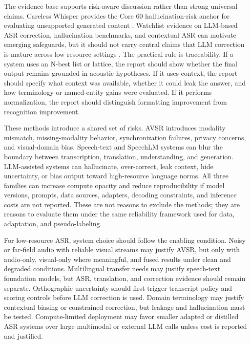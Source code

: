 \documentclass[pdflatex,sn-basic]{sn-jnl}
\theoremstyle{thmstyleone}
\theoremstyle{thmstyletwo}
\theoremstyle{thmstylethree}
\begin{document}
The evidence base supports risk-aware discussion rather than strong universal claims. Careless Whisper provides the Core 60 hallucination-risk anchor for evaluating unsupported generated content \citep{koenecke2024carelesswhisper}. Watchlist evidence on LLM-based ASR correction, hallucination benchmarks, and contextual ASR can motivate emerging safeguards, but it should not carry central claims that LLM correction is mature across low-resource settings \citep{ma2024asrerrorcorrection,koudounas2025shallow,wang2025contextasrbench}. The practical rule is traceability. If a system uses an N-best list or lattice, the report should show whether the final output remains grounded in acoustic hypotheses. If it uses context, the report should specify what context was available, whether it could leak the answer, and how terminology or named-entity gains were evaluated. If it performs normalization, the report should distinguish formatting improvement from recognition improvement.

These methods introduce a shared set of risks. AVSR introduces modality mismatch, missing-modality behavior, synchronization failures, privacy concerns, and visual-domain bias. Speech-text and SpeechLM systems can blur the boundary between transcription, translation, understanding, and generation. LLM-assisted systems can hallucinate, over-correct, leak context, hide uncertainty, or bias output toward high-resource language norms. All three families can increase compute opacity and reduce reproducibility if model versions, prompts, data sources, adapters, decoding constraints, and inference costs are not reported. These are not reasons to exclude the methods; they are reasons to evaluate them under the same reliability framework used for data, adaptation, and pseudo-labeling.

For low-resource ASR, system choice should follow the enabling condition. Noisy or far-field audio with reliable visual streams may justify AVSR, but only with audio-only, visual-only where meaningful, and fused results under clean and degraded conditions. Multilingual transfer needs may justify speech-text foundation models, but ASR, translation, and correction evidence should remain separate. Orthographic uncertainty should first trigger transcript-policy and scoring controls before LLM correction is used. Domain terminology may justify contextual biasing or constrained correction, but leakage and hallucination must be tested. Compute-limited deployment may favor smaller adapted or distilled ASR systems over large multimodal or external LLM calls unless cost is reported and justified.
\end{document}
